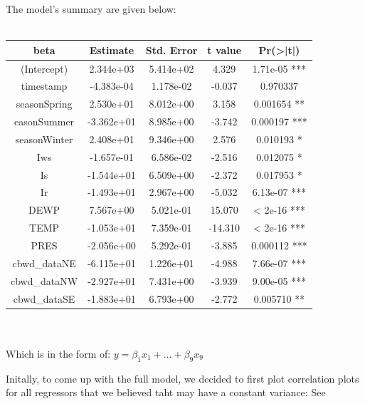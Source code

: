 The model's summary are given below:
\\
\\
\begin{tabular}{|c|c|c|c|c|}
\hline       beta   &    Estimate & Std. Error &t value &Pr(>|t|)    \\
\hline (Intercept)  & 2.344e+03  &5.414e+02 &  4.329 &1.71e-05 *** \\
\hline timestamp    & -4.383e-04 & 1.178e-02&  -0.037& 0.970337    \\
\hline seasonSpring & 2.530e+01  &8.012e+00  & 3.158 &0.001654 **  \\
\hline easonSummer  & -3.362e+01 & 8.985e+00 &-3.742 &0.000197 *** \\
\hline seasonWinter & 2.408e+01  &9.346e+00  & 2.576 &0.010193 *   \\
\hline Iws          & -1.657e-01 & 6.586e-02 & -2.516& 0.012075 *   \\
\hline Is           & -1.544e+01 & 6.509e+00 & -2.372& 0.017953 *   \\
\hline Ir           & -1.493e+01 & 2.967e+00 & -5.032 &6.13e-07 *** \\
\hline DEWP         & 7.567e+00  &5.021e-01  &15.070  &< 2e-16 *** \\
\hline TEMP         & -1.053e+01 & 7.359e-01 &-14.310 & < 2e-16 *** \\
\hline PRES         & -2.056e+00 & 5.292e-01 & -3.885 &0.000112 *** \\
\hline cbwd\_dataNE  & -6.115e+01 & 1.226e+01 & -4.988 &7.66e-07 *** \\
\hline cbwd\_dataNW  & -2.927e+01 & 7.431e+00 & -3.939 &9.00e-05 *** \\
\hline cbwd\_dataSE  & -1.883e+01 & 6.793e+00 & -2.772 &0.005710 **  \\
\hline
\end{tabular}
\\
\\

Which is in the form of: $y = \beta_1 x_1 + \dots + \beta_9 x_9 \label{eq: Full Model}$

Initally, to come up with the full model, we decided to first plot correlation plots for all regressors that we believed taht may have a constant variance: See 

